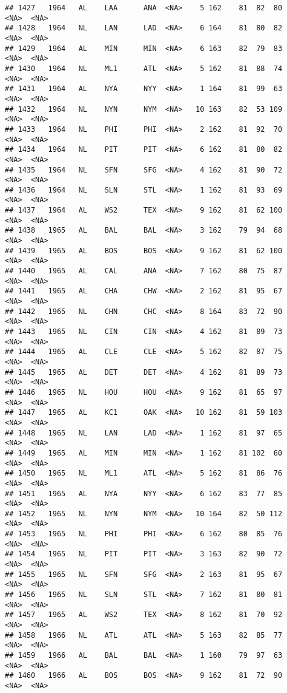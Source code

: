 \documentclass[]{article}
\begin{document}
\begin{verbatim}
## 1427   1964   AL    LAA      ANA  <NA>    5 162    81  82  80   <NA>  <NA>
## 1428   1964   NL    LAN      LAD  <NA>    6 164    81  80  82   <NA>  <NA>
## 1429   1964   AL    MIN      MIN  <NA>    6 163    82  79  83   <NA>  <NA>
## 1430   1964   NL    ML1      ATL  <NA>    5 162    81  88  74   <NA>  <NA>
## 1431   1964   AL    NYA      NYY  <NA>    1 164    81  99  63   <NA>  <NA>
## 1432   1964   NL    NYN      NYM  <NA>   10 163    82  53 109   <NA>  <NA>
## 1433   1964   NL    PHI      PHI  <NA>    2 162    81  92  70   <NA>  <NA>
## 1434   1964   NL    PIT      PIT  <NA>    6 162    81  80  82   <NA>  <NA>
## 1435   1964   NL    SFN      SFG  <NA>    4 162    81  90  72   <NA>  <NA>
## 1436   1964   NL    SLN      STL  <NA>    1 162    81  93  69   <NA>  <NA>
## 1437   1964   AL    WS2      TEX  <NA>    9 162    81  62 100   <NA>  <NA>
## 1438   1965   AL    BAL      BAL  <NA>    3 162    79  94  68   <NA>  <NA>
## 1439   1965   AL    BOS      BOS  <NA>    9 162    81  62 100   <NA>  <NA>
## 1440   1965   AL    CAL      ANA  <NA>    7 162    80  75  87   <NA>  <NA>
## 1441   1965   AL    CHA      CHW  <NA>    2 162    81  95  67   <NA>  <NA>
## 1442   1965   NL    CHN      CHC  <NA>    8 164    83  72  90   <NA>  <NA>
## 1443   1965   NL    CIN      CIN  <NA>    4 162    81  89  73   <NA>  <NA>
## 1444   1965   AL    CLE      CLE  <NA>    5 162    82  87  75   <NA>  <NA>
## 1445   1965   AL    DET      DET  <NA>    4 162    81  89  73   <NA>  <NA>
## 1446   1965   NL    HOU      HOU  <NA>    9 162    81  65  97   <NA>  <NA>
## 1447   1965   AL    KC1      OAK  <NA>   10 162    81  59 103   <NA>  <NA>
## 1448   1965   NL    LAN      LAD  <NA>    1 162    81  97  65   <NA>  <NA>
## 1449   1965   AL    MIN      MIN  <NA>    1 162    81 102  60   <NA>  <NA>
## 1450   1965   NL    ML1      ATL  <NA>    5 162    81  86  76   <NA>  <NA>
## 1451   1965   AL    NYA      NYY  <NA>    6 162    83  77  85   <NA>  <NA>
## 1452   1965   NL    NYN      NYM  <NA>   10 164    82  50 112   <NA>  <NA>
## 1453   1965   NL    PHI      PHI  <NA>    6 162    80  85  76   <NA>  <NA>
## 1454   1965   NL    PIT      PIT  <NA>    3 163    82  90  72   <NA>  <NA>
## 1455   1965   NL    SFN      SFG  <NA>    2 163    81  95  67   <NA>  <NA>
## 1456   1965   NL    SLN      STL  <NA>    7 162    81  80  81   <NA>  <NA>
## 1457   1965   AL    WS2      TEX  <NA>    8 162    81  70  92   <NA>  <NA>
## 1458   1966   NL    ATL      ATL  <NA>    5 163    82  85  77   <NA>  <NA>
## 1459   1966   AL    BAL      BAL  <NA>    1 160    79  97  63   <NA>  <NA>
## 1460   1966   AL    BOS      BOS  <NA>    9 162    81  72  90   <NA>  <NA>

\end{verbatim}
\end{document}
